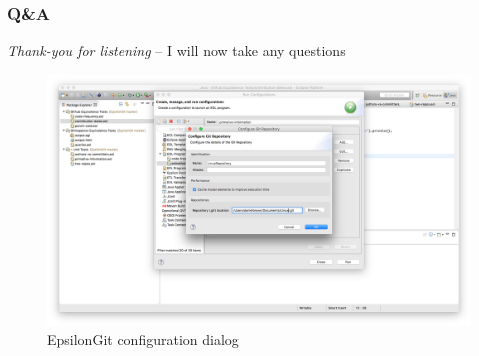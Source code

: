 \documentclass[aspectratio=1610]{beamer}
\begin{document}
\begin{frame}
	\frametitle{Q\&A}
	\textit{Thank-you for listening} -- I will now take any questions	\begin{figure}[h]
	\centering
	\includegraphics[width=\textwidth]{../thesis/images/epsilonintegration}
	\caption{EpsilonGit configuration dialog}
	\label{fig:epsilonintegration}
\end{figure}
\end{frame}
\end{document}
